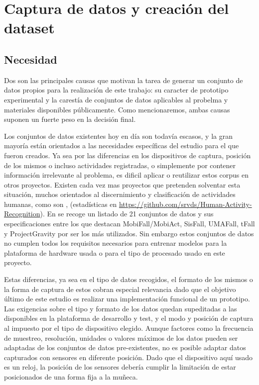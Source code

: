 \documentclass[../tfm.tex]{subfiles}
\begin{document}
\section{Captura de datos y creación del dataset}

\subsection{Necesidad}

Dos son las principales causas que motivan la tarea de generar un conjunto de datos propios para la realización de este trabajo: su caracter de prototipo experimental y la carestía de conjuntos de datos aplicables al probelma y materiales disponibles públicamente. Como mencionaremos, ambas causas suponen un fuerte peso en la decisión final.


Los conjuntos de datos existentes hoy en día son todavía escasos, y la gran mayoría están orientados a las necesidades específicas del estudio para el que fueron creados. Ya sea por las diferencias en los dispositivos de captura, posición de los mismos o incluso actividades registradas, o simplemente por contener información irrelevante al problema, es dificil aplicar o reutilizar estos corpus en otros proyectos. Existen cada vez mas proyectos que pretenden solventar esta situación, muchos orientados al discernimiento y clasificación de actividades humanas, como son \cite{Anguita2013,ReyesOrtiz2014}, (estadísticas en \url{https://github.com/srvds/Human-Activity-Recognition}). En \cite{Casilari2020} se recoge un listado de 21 conjuntos de datos y sus especificaciones entre los que destacan MobiFall\cite{MobiFall}/MobiAct\cite{MobiAct}, SisFall\cite{Sucerquia2017}, UMAFall\cite{EduUMA2017}, tFall\cite{tfall} y ProjectGravity\cite{Vilarinho2015} por ser los más utilizados. Sin embargo estos conjuntos de datos no cumplen todos los requisitos necesarios para entrenar modelos para la plataforma de hardware usada o para el tipo de procesado usado en este proyecto.

Estas diferencias, ya sea en el tipo de datos recogidos, el formato de los mismos o la forma de captura de estos cobran especial relevancia dado que el objetivo último de este estudio es realizar una implementación funcional de un prototipo. Las exigencias sobre el tipo y formato de los datos quedan supeditadas a las disponibles en la plataforma de desarrollo y test, y el modo y posición de captura al impuesto por el tipo de dispositivo elegido. Aunque factores como la frecuencia de muestreo, resolución, unidades o valores máximos de los datos pueden ser adaptadas de los conjuntos de datos pre-existentes, no es posible adaptar datos capturados con sensores en diferente posición. Dado que el dispositivo aquí usado es un reloj, la posición de los sensores debería cumplir la limitación de estar posicionados de una forma fija a la muñeca.
\end{document}
